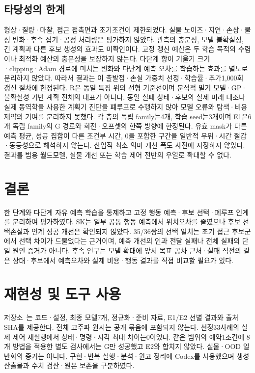 \documentclass[conference,a4paper]{IEEEtran}
\begin{document}
\subsection{타당성의 한계}
형상·질량·마찰, 접근 접촉면과 초기조건이 제한되었다.
실물 노이즈·지연·손상·물성 변화·후속 집기·공정 처리량은 평가하지 않았다.
관측의 충분성, 모델 불확실성, 긴 계획과 다른 후보 생성의 효과도 미확인이다.
고정 갱신 예산은 두 학습 목적의 수렴이나 최적화 예산의 충분성을 보장하지 않는다.
다단계 항이 기울기 크기·clipping·Adam 경로에 미치는 변화와 다단계 예측 오차를 학습하는 효과를 별도로 분리하지 않았다.
따라서 결과는 이 출발점·손실 가중치 선정·학습률·추가1,000회 갱신 절차에 한정된다.
R은 동일 특징 위의 선형 기준선이며 분석적 밀기 모델·GP·불확실성 기반 계획 전체의 대표가 아니다.
동일 실패 상태·후보의 실제 미래 대조나 실제 동역학을 사용한 계획기 진단을 폐루프로 수행하지 않아 모델 오류와 탐색·비용 제약의 기여를 분리하지 못했다.
각 층의 독립 family는4개, 학습 seed는3개이며 E1은6개 독립 family의 G 경로와 회전·오프셋의 한쪽 방향에 한정된다.
유효 mask가 다른 예측 평균, 성공 집합이 다른 조건부 시간, 0을 포함한 구간을 일반적 우위·시간 절감·동등성으로 해석하지 않는다.
산업적 최소 의미 개선 폭도 사전에 지정하지 않았다.
결과를 범용 월드모델, 실물 개선 또는 학습 제어 전반의 우열로 확대할 수 없다.

\section{결론}\label{sec:conclusion}
한 단계와 다단계 자유 예측 학습을 통제하고 고정 행동 예측·후보 선택·폐루프 인계를 분리하여 평가하였다.
SK는 일부 공통 행동 예측에서 위치오차를 줄였으나 후보 선택손실과 인계 성공 개선은 확인되지 않았다.
35/36쌍의 선택 일치는 초기 접근 후보군에서 선택 차이가 드물었다는 근거이며, 예측 개선의 인과 전달 실패나 전체 실패의 단일 원인 증거가 아니다.
후속 연구는 모델 확대에 앞서 목표 공차 근처·실패 직전의 같은 상태·후보에서 예측오차와 실제 비용·행동 결과를 직접 비교할 필요가 있다.

\section*{재현성 및 도구 사용}
저장소~\cite{repository}는 코드·설정, 최종 모델7개, 정규화·준비 자료, E1/E2 선별 결과와 출처 SHA를 제공한다.
전체 고주파 원시는 공개 묶음에 포함되지 않는다.
선정33사례의 실제 제어 재실행에서 상태·명령·시각 최대 차이는0이었다.
같은 범위의 예약1조건에 8개 방법을 적용한 별도 검사에서는 G만 성공했고 E2와 합치지 않았다.
실물·OOD 일반화의 증거는 아니다.
구현·반복 실행·분석·원고 정리에 Codex를 사용했으며 생성 산출물과 수치 검산·원본 보존을 구분하였다.



\end{document}
